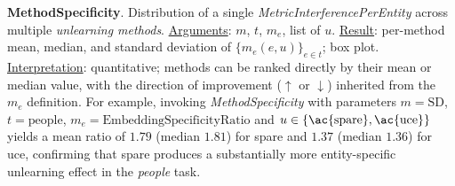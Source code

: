 %
%

{\bf MethodSpecificity}. Distribution of a single \textit{MetricInterferencePerEntity}
across multiple \textit{unlearning methods}.
\underline{Arguments}: $m$, $t$, $m_e$, list of $u$.
\underline{Result}: per-method mean, median, and standard deviation of
$\{m_e(e, u)\}_{e \in t}$; box plot.
\underline{Interpretation}: quantitative; methods can be ranked directly by their mean
or median value, with the direction of improvement ($\uparrow$ or $\downarrow$) inherited
from the $m_e$ definition.
%
For example, invoking \textit{MethodSpecificity} with parameters $m=\text{SD}$,
$t=\text{people}$, $m_e=\text{EmbeddingSpecificityRatio}$ and
$u \in \{\text{\ac{spare}}, \text{\ac{uce}}\}$ yields a mean ratio of
$1.79$ (median $1.81$) for \ac{spare} and $1.37$ (median $1.36$) for \ac{uce},
confirming that \ac{spare} produces a substantially more entity-specific unlearning
effect in the \textit{people} task.
